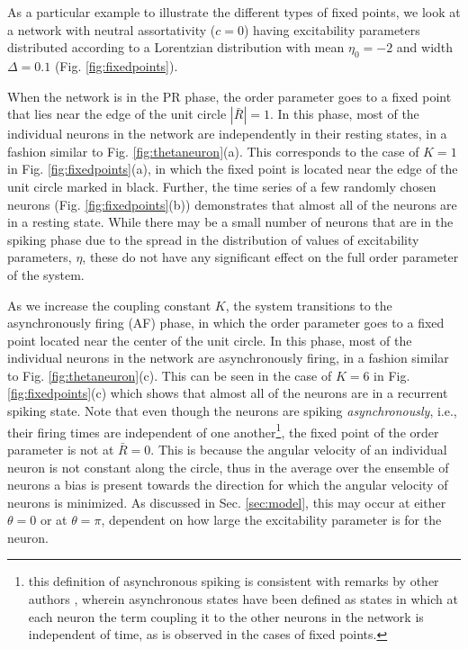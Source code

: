 \documentclass[%
 aip,
 sd,%
 amsmath,amssymb,
 reprint,%
]{revtex4-1}
\begin{document}
As a particular example to illustrate the different types of fixed points, we look at a network with neutral assortativity ($c=0$) having excitability parameters distributed according to a Lorentzian distribution with mean $\eta_0=-2$ and width $\Delta=0.1$ (Fig. \ref{fig:fixedpoints}).

When the network is in the PR phase, the order parameter goes to a fixed point that lies near the edge of the unit circle $|\bar{R}|=1$. In this phase, most of the individual neurons in the network are independently in their resting states, in a fashion similar to Fig. \ref{fig:thetaneuron}(a). This corresponds to the case of $K=1$ in Fig. \ref{fig:fixedpoints}(a), in which the fixed point is located near the edge of the unit circle marked in black. Further, the time series of a few randomly chosen neurons (Fig. \ref{fig:fixedpoints}(b)) demonstrates that almost all of the neurons are in a resting state. While there may be a small number of neurons that are in the spiking phase due to the spread in the distribution of values of excitability parameters, $\eta$, these do not have any significant effect on the full order parameter of the system.

As we increase the coupling constant $K$, the system transitions to the asynchronously firing (AF) phase, in which the order parameter goes to a fixed point located near the center of the unit circle. In this phase, most of the individual neurons in the network are asynchronously firing, in a fashion similar to  Fig. \ref{fig:thetaneuron}(c). This can be seen in the case of $K=6$ in Fig. \ref{fig:fixedpoints}(c) which shows that almost all of the neurons are in a recurrent spiking state. Note that even though the neurons are spiking \emph{asynchronously}, i.e., their firing times are independent of one another\footnote{this definition of asynchronous spiking is consistent with remarks by other authors \cite{abbott1993asynchronous, hansel2001existence}, wherein asynchronous states have been defined as states in which at each neuron the term coupling it to the other neurons in the network is independent of time, as is observed in the cases of fixed points.}, the fixed point of the order parameter is not at $\bar{R}=0$. This is because the angular velocity of an individual neuron is not constant along the circle, thus in the average over the ensemble of neurons a bias is present towards the direction for which the angular velocity of neurons is minimized. As discussed in Sec. \ref{sec:model}, this may occur at either $\theta=0$ or at $\theta=\pi$, dependent on how large the excitability parameter is for the neuron.
\end{document}

